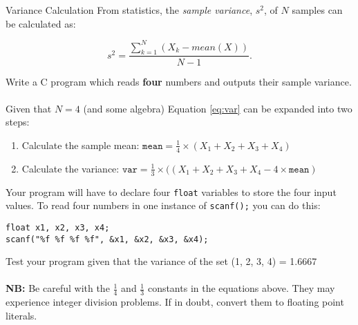 \documentclass{lab}
\begin{document}
\begin{task}{Variance Calculation}{}
From statistics, the \textit{sample variance}, $s^2$, of $N$ samples can be calculated as:

\begin{equation}\label{eq:var}
s^2 = \frac{\sum_{k=1}^{N}(X_k - mean(X))}{N-1}.
\end{equation}

Write a C program which reads \textbf{four} numbers and outputs their sample variance.
\\ \\
Given that $N = 4$ (and some algebra) Equation \ref{eq:var} can be expanded into two steps:

\begin{enumerate}
\item Calculate the sample mean: $\texttt{mean} = \frac{1}{4} \times \left( X_1 + X_2 + X_3 + X_4 \right)$
\item Calculate the variance: $\texttt{var} = \frac{1}{3} \times ((X_1 + X_2 + X_3 + X_4 - 4 \times \texttt{mean})$
\end{enumerate}

Your program will have to declare four \texttt{float} variables to store the four input values. To read four numbers in one instance of \texttt{scanf();} you can do this:

\begin{lstlisting}[style=CStyle]
float x1, x2, x3, x4;
scanf("%f %f %f %f", &x1, &x2, &x3, &x4);
\end{lstlisting}

Test your program given that the variance of the set (1, 2, 3, 4) = 1.6667
\\ \\
\textbf{NB:} Be careful with the $\frac{1}{4}$ and $\frac{1}{3}$ constants in the equations above. They may experience integer division problems. If in doubt, convert them to floating point literals.
\end{task}
\end{document}
